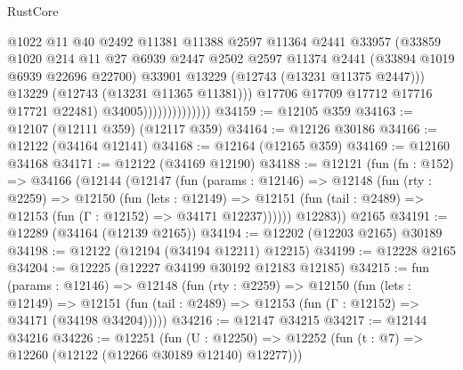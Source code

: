 \begin{lexlean}{RustCore}
\begin{coremodule}
                                    @1022
                                    @11
                                    @40
                                    @2492
                                    @11381
                                    @11388
                                    @2597
                                    @11364
                                    @2441
                                    @33957
                                    (@33859
                                      @1020
                                      @214
                                      @11
                                      @27
                                      @6939
                                      @2447
                                      @2502
                                      @2597
                                      @11374
                                      @2441
                                      (@33894 @1019 @6939 @22696 @22700)
                                      @33901
                                      @13229
                                      (@12743 (@13231 @11375 @2447)))
                                    @13229
                                    (@12743 (@13231 @11365 @11381)))
                                  @17706
                                  @17709
                                  @17712
                                  @17716
                                  @17721
                                  @22481)
                                @34005))))))))))))))
@34159 := @12105 @359
@34163 := @12107 (@12111 @359) (@12117 @359)
@34164 := @12126 @30186
@34166 := @12122 (@34164 @12141)
@34168 := @12164 (@12165 @359)
@34169 := @12160 @34168
@34171 := @12122 (@34169 @12190)
@34188 := @12121
    (fun (fn : @152) =>
    @34166
      (@12144
        (@12147
          (fun (params : @12146) =>
          @12148
            (fun (rty : @2259) =>
            @12150
              (fun (lets : @12149) =>
              @12151 (fun (tail : @2489) => @12153 (fun (Γ : @12152) => @34171 @12237))))))
        @12283))
    @2165
@34191 := @12289 (@34164 (@12139 @2165))
@34194 := @12202 (@12203 @2165) @30189
@34198 := @12122 (@12194 (@34194 @12211) @12215)
@34199 := @12228 @2165
@34204 := @12225 (@12227 @34199 @30192 @12183 @12185)
@34215 := fun (params : @12146) =>
  @12148
    (fun (rty : @2259) =>
    @12150
      (fun (lets : @12149) =>
      @12151 (fun (tail : @2489) => @12153 (fun (Γ : @12152) => @34171 (@34198 @34204)))))
@34216 := @12147 @34215
@34217 := @12144 @34216
@34226 := @12251
    (fun (U : @12250) => @12252 (fun (t : @7) => @12260 (@12122 (@12266 @30189 @12140) @12277)))

\end{coremodule}
\end{lexlean}
